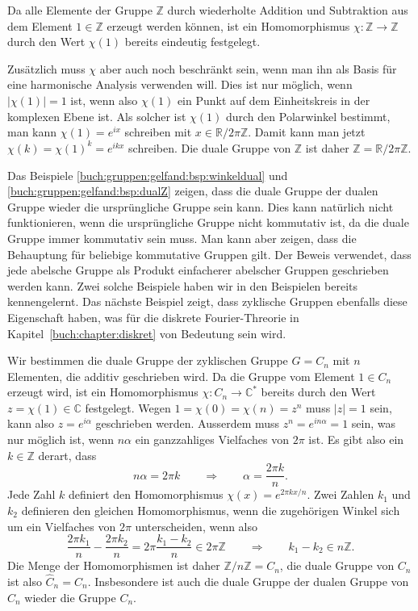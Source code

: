 \begin{beispiel}
\label{buch:gruppen:gelfand:bsp:dualZ}
Da alle Elemente der Gruppe $\mathbb{Z}$ durch wiederholte Addition 
und Subtraktion aus dem Element $1\in\mathbb{Z}$ erzeugt werden können,
ist ein Homomorphismus $\chi\colon \mathbb{Z}\to\mathbb{Z}$ durch
den Wert $\chi(1)$ bereits eindeutig festgelegt.

Zusätzlich muss $\chi$ aber auch noch beschränkt sein, wenn man ihn
als Basis für eine harmonische Analysis verwenden will.
Dies ist nur möglich, wenn $|\chi(1)|=1$ ist, wenn also $\chi(1)$
ein Punkt auf dem Einheitskreis in der komplexen Ebene ist.
Als solcher ist $\chi(1)$ durch den Polarwinkel bestimmt, man kann
$\chi(1)=e^{ix}$ schreiben mit $x\in\mathbb{R}/2\pi\mathbb{Z}$.
Damit kann man jetzt $\chi(k)=\chi(1)^k = e^{ikx}$ schreiben.
Die duale Gruppe von $\mathbb{Z}$ ist daher
$\hat{\mathbb{Z}} = \mathbb{R}/2\pi \mathbb{Z}$.
\end{beispiel}

Das Beispiele
\ref{buch:gruppen:gelfand:bsp:winkeldual}
und
\ref{buch:gruppen:gelfand:bsp:dualZ}
zeigen, dass die duale Gruppe der dualen Gruppe wieder die ursprüngliche
Gruppe sein kann.
Dies kann natürlich nicht funktionieren, wenn die ursprüngliche Gruppe
nicht kommutativ ist, da die duale Gruppe immer kommutativ sein muss.
Man kann aber zeigen, dass die Behauptung für beliebige kommutative
Gruppen gilt.
Der Beweis verwendet, dass jede abelsche Gruppe als Produkt einfacherer
abelscher Gruppen geschrieben werden kann.
Zwei solche Beispiele haben wir in den Beispielen bereits kennengelernt.
Das nächste Beispiel zeigt, dass zyklische Gruppen ebenfalls diese Eigenschaft
haben, was für die diskrete Fourier-Threorie in
Kapitel~\ref{buch:chapter:diskret} von Bedeutung sein wird.

\begin{beispiel}
Wir bestimmen die duale Gruppe der zyklischen Gruppe $G=C_n$ mit $n$
Elementen, die additiv geschrieben wird.
Da die Gruppe vom Element $1\in C_n$ erzeugt wird, ist
ein Homomorphismus $\chi\colon C_n\to\mathbb{C}^*$ bereits durch den
Wert $z=\chi(1)\in\mathbb{C}$ festgelegt.
Wegen $1=\chi(0)=\chi(n)=z^n$ muss $|z|=1$ sein, kann also $z=e^{i\alpha}$
geschrieben werden.
Ausserdem muss $z^n=e^{in\alpha}=1$ sein, was nur möglich ist, wenn
$n\alpha$ ein ganzzahliges Vielfaches von $2\pi$ ist.
Es gibt also ein $k\in \mathbb{Z}$ derart, dass 
\[
n\alpha = 2\pi k
\qquad
\Rightarrow
\qquad
\alpha = \frac{2\pi k}{n}.
\]
Jede Zahl $k$ definiert den Homomorphismus $\chi(x) = e^{2\pi kx/n}$.
Zwei Zahlen $k_1$ und $k_2$ definieren den gleichen Homomorphismus,
wenn die zugehörigen Winkel sich um ein Vielfaches von $2\pi$ unterscheiden,
wenn also
\[
\frac{2\pi k_1}{n} - \frac{2\pi k_2}{n}
=
2\pi\frac{k_1-k_2}{n}
\in
2\pi \mathbb{Z}
\qquad\Rightarrow\qquad
k_1-k_2
\in
n\mathbb{Z}.
\]
Die Menge der Homomorphismen ist daher $\mathbb{Z}/n\mathbb{Z}=C_n$,
die duale Gruppe von $C_n$ ist also $\hat{C}_n=C_n$.
Insbesondere ist auch die duale Gruppe der dualen Gruppe von $C_n$ 
wieder die Gruppe $C_n$.
\end{beispiel}


